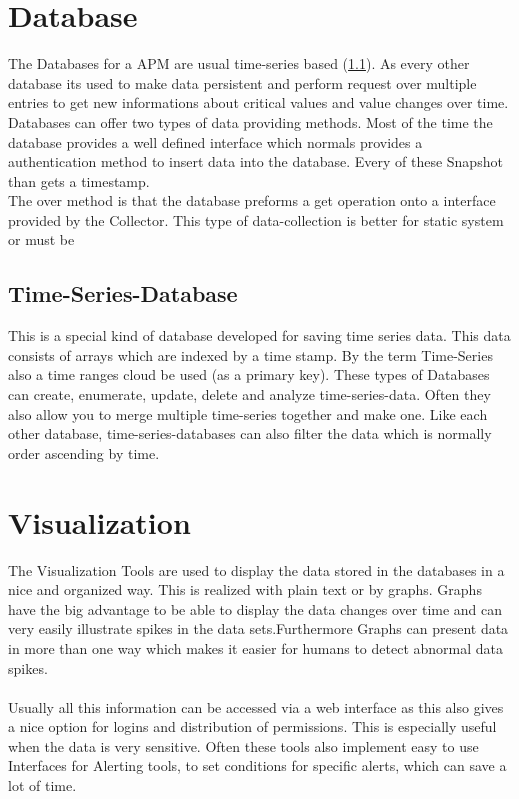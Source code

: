 \section{Database}
The Databases for a APM are usual time-series based (\ref{TS-Database}). As every other database its used to make data persistent and perform request over multiple entries to get new informations about critical values and value changes over time.
Databases can offer two types of data providing methods. Most of the time the database provides a well defined interface which normals provides a authentication method to insert data into the database. Every of these Snapshot than gets a timestamp.\\
The over method is that the database preforms a get operation onto a interface provided by the Collector. This type of data-collection is better for static system or must be 

\subsection{Time-Series-Database}
\label{TS-Database}
This is a special kind of database developed for saving time series data. This data consists of arrays which are indexed by a time stamp. By the term Time-Series also a time ranges cloud be used (as a primary key). These types of Databases  can create, enumerate, update, delete and analyze time-series-data.
Often they also allow you to merge multiple time-series together and make one.
Like each other database, time-series-databases can also filter the data which is normally order ascending by time.

\section{Visualization} 
The Visualization Tools are used to display the data stored in the databases in a nice and organized way. This is realized with plain text or by graphs. Graphs have the big advantage to be able to display the data changes over time and can very easily illustrate spikes in the data sets.Furthermore Graphs can present data in more than one way which makes it easier for humans to detect abnormal data spikes.\\
\\ 
Usually all this information can be accessed via a web interface as this also gives a nice option for logins and distribution of permissions. This is especially useful when the data is very sensitive.
Often these tools also implement easy to use Interfaces for Alerting tools, to set conditions for specific alerts, which can save a lot of time.

